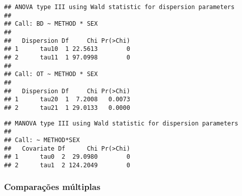 
\begin{knitrout}
\color{fgcolor}\begin{kframe}
\begin{alltt}
                     \hlstd{=} \hlstd{(}\hlstd{(}\hlstd{,}\hlstd{),} \hlstd{(}\hlstd{,}\hlstd{)),}
                     \hlstd{=} \hlstd{(}\hlstd{(}\hlstd{,} \hlstd{),}
                                 \hlstd{(}\hlstd{,} \hlstd{)))}
\end{alltt}
\begin{verbatim}
## ANOVA type III using Wald statistic for dispersion parameters
## 
## Call: BD ~ METHOD * SEX
## 
##   Dispersion Df     Chi Pr(>Chi)
## 1      tau10  1 22.5613        0
## 2      tau11  1 97.0998        0
## 
## Call: OT ~ METHOD * SEX
## 
##   Dispersion Df     Chi Pr(>Chi)
## 1      tau20  1  7.2008   0.0073
## 2      tau21  1 29.0133   0.0000
\end{verbatim}
\end{kframe}
\end{knitrout}


\begin{knitrout}
\color{fgcolor}\begin{kframe}
\begin{alltt}
                      \hlstd{=} \hlstd{(}\hlstd{,}\hlstd{),}
                      \hlstd{=} \hlstd{(}\hlstd{,} \hlstd{))}
\end{alltt}
\begin{verbatim}
## MANOVA type III using Wald statistic for dispersion parameters
## 
## Call: ~ METHOD*SEX
##   Covariate Df      Chi Pr(>Chi)
## 1      tau0  2  29.0980        0
## 2      tau1  2 124.2049        0
\end{verbatim}
\end{kframe}
\end{knitrout}

\subsubsection{Comparações múltiplas}

